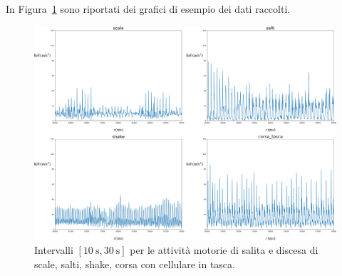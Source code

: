 \documentclass[./main.tex]{subfiles}
\begin{document}
In Figura~\ref{fig:esempio} sono riportati dei grafici di esempio dei dati raccolti.
\begin{figure}[H]
	\centering
	\includegraphics[width=.99\textwidth, keepaspectratio]{../../figure/espl.png}
	\caption{Intervalli $ [\SI{10}{\second}, \SI{30}{\second}] $ per le attività motorie di salita e discesa di scale, salti, shake, corsa con cellulare in tasca.}
	\label{fig:esempio}
\end{figure}
\end{document}
